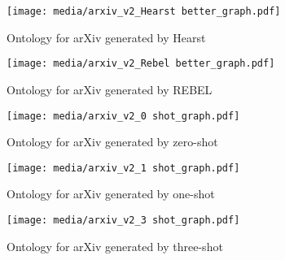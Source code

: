 \begin{figure}[h]
    \centering
    \texttt{[image: media/arxiv\_v2\_Hearst better\_graph.pdf]}
    \caption{Ontology for arXiv generated by Hearst}
\end{figure}


\begin{figure}[h]
    \centering
    \texttt{[image: media/arxiv\_v2\_Rebel better\_graph.pdf]}
    \caption{Ontology for arXiv generated by REBEL}
\end{figure}


\begin{figure}[h]
    \centering
    \texttt{[image: media/arxiv\_v2\_0 shot\_graph.pdf]}
    \caption{Ontology for arXiv generated by zero-shot}
\end{figure}

\begin{figure}[h]
    \centering
    \texttt{[image: media/arxiv\_v2\_1 shot\_graph.pdf]}
    \caption{Ontology for arXiv generated by one-shot}
\end{figure}

\begin{figure}[h]
    \centering
    \texttt{[image: media/arxiv\_v2\_3 shot\_graph.pdf]}
    \caption{Ontology for arXiv generated by three-shot}
\end{figure}

